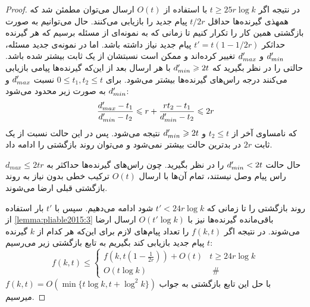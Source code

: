 \begin{proof}
	در نتیجه اگر
	$t \geq 25 r \log k$
	با استفاده از
	$O(t)$
	ارسال می‌توان مطمئن شد که همهذی گیرنده‌ها حداقل
	$t/2r$
	پیام جدید را بازیابی می‌کنند. حال می‌توانیم به صورت بازگشتی همین کار را تکرار کنیم تا زمانی که به نمونه‌ای از مسئله برسیم که هر گیرنده حداثکر
	$t' = t(1 - 1/2r)$
	پیام جدید نیاز داشته باشد. اما در نمونه‌ی جدید مسئله،
	$d_{min}'$
	و
	$d_{max}'$
	تغییر کرده‌اند و ممکن است نسبتشان از یک ثابت بیشتر شده باشد. حالتی را در نظر بگیرید که
	$d_{min}' \geqslant 2t$
	با هر ارسال بعد از این‌که گیرنده‌ها پیامی بازیابی می‌کنند درجه راس‌های گیرنده‌ها بیشتر می‌شود. برای
	$0 \leq t_1, t_2 \leq t$
	نسبت
	$d_{max}'$
	و
	$d_{min}'$
	به صورت زیر محدود می‌شود:
	\begin{equation}
		\dfrac{d_{max}' - t_1}{d_{min}' - t_2} \leqslant r + \dfrac{rt_2 - t_1}{d_{min}' - t_2} \leqslant 2r
	\end{equation}
	که نامساوی آخر از 
	$t_2 \leq t$
	و
	$d_{min}' \geqslant 2t$
	نتیجه می‌شود. پس در این حالت نسبت از یک ثابت
	$2r$
	در بدترین حالت بیشتر نمی‌شود و می‌توان روند بازگشتی را ادامه داد.
	
	حال حالت
	$d_{min}' < 2t$
	را در نظر بگیرید. چون راس‌های گیرنده‌ها حداکثر به
	$d_{max} \leq 2tr$
	راس پیام وصل نیستند، تمام آن‌ها با ارسال
	$O(t)$
	ترکیب خطی بدون نیاز به روند بازگشتی قبلی ارضا می‌شوند.
	
	روند بازگشتی را تا زمانی که
	$t' < 24r \log k$
	شود ادامه می‌دهیم. سپس با 
	$t'$
	بار استفاده از 
	\autoref{lemma:pliable2015:3}
	باقی‌مانده گیرنده‌ها نیز با
	$O(t' \log k)$
	ارسال ارضا می‌شوند. در نتیجه اگر
	$f(k, t)$
	را تعداد پیام‌های لازم برای این‌که هر کدام از
	$k$
	گیرنده
	$t$
	پیام جدید بازیابی کند بگیریم به تابع بازگشتی زیر می‌رسیم:
	\begin{equation}
		f(k, t) \leq \begin{cases}f\left(k, t\left(1-\frac{1}{2 r}\right)\right)+O(t) & t \geq 24 r \log k \\ O(t \log k) & \text { \# }\end{cases}
	\end{equation}
	با حل این تابع بازگشتی به جواب
	$f(k, t) = O(\min\{t \log k, t + \log^2 k\})$
	میرسیم.
\end{proof}

